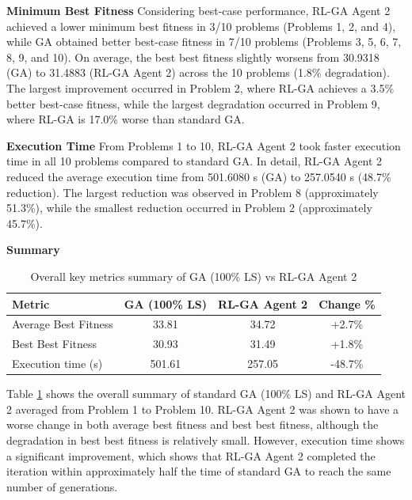 \documentclass{article}
\begin{document}
\textbf{Minimum Best Fitness} \newline
Considering best-case performance, RL-GA Agent 2 achieved a lower minimum best fitness in 3/10 problems (Problems 1, 2, and 4), while GA obtained better best-case fitness in 7/10 problems (Problems 3, 5, 6, 7, 8, 9, and 10). On average, the best best fitness slightly worsens from 30.9318 (GA) to 31.4883 (RL-GA Agent 2) across the 10 problems (1.8\% degradation). The largest improvement occurred in Problem 2, where RL-GA achieves a 3.5\% better best-case fitness, while the largest degradation occurred in Problem 9, where RL-GA is 17.0\% worse than standard GA.

\textbf{Execution Time} \newline
From Problems 1 to 10, RL-GA Agent 2 took faster execution time in all 10 problems compared to standard GA. In detail, RL-GA Agent 2 reduced the average execution time from 501.6080 s (GA) to 257.0540 s (48.7\% reduction). The largest reduction was observed in Problem 8 (approximately 51.3\%), while the smallest reduction occurred in Problem 2 (approximately 45.7\%).

\textbf{Summary} \newline
\begin{table}[H]
\centering
\small
\begin{tabular}{lccc}
\toprule
\textbf{Metric} & \textbf{GA (100\% LS)} & \textbf{RL-GA Agent 2} & \textbf{Change \%} \\
\midrule
Average Best Fitness & 33.81 & 34.72 & +2.7\% \\
Best Best Fitness & 30.93 & 31.49 & +1.8\% \\
Execution time (s) & 501.61 & 257.05 & -48.7\% \\
\bottomrule
\end{tabular}
\caption{Overall key metrics summary of GA (100\% LS) vs RL-GA Agent 2}
\label{tab:overall_summary_100}
\end{table}
Table \ref{tab:overall_summary_100} shows the overall summary of standard GA (100\% LS) and RL-GA Agent 2 averaged from Problem 1 to Problem 10. RL-GA Agent 2 was shown to have a worse change in both average best fitness and best best fitness, although the degradation in best best fitness is relatively small. However, execution time shows a significant improvement, which shows that RL-GA Agent 2 completed the iteration within approximately half the time of standard GA to reach the same number of generations.

\end{document}

